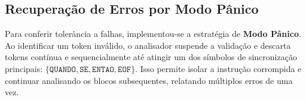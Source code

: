 \documentclass[12pt, a4paper]{article}
\begin{document}
\begin{table}[H]
\centering
{}
\caption{Matriz LL(1) - Parte 3: Condições e Fim de Pilha}
\end{table}

\subsection{Recuperação de Erros por Modo Pânico}
Para conferir tolerância a falhas, implementou-se a estratégia de \textbf{Modo Pânico}. Ao identificar um token inválido, o analisador suspende a validação e descarta tokens contínua e sequencialmente até atingir um dos símbolos de sincronização principais: $\{\texttt{QUANDO}, \texttt{SE}, \texttt{ENTAO}, \texttt{EOF}\}$. Isso permite isolar a instrução corrompida e continuar analisando os blocos subsequentes, relatando múltiplos erros de uma vez.
\end{document}
